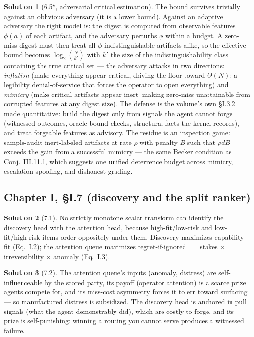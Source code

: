 \documentclass[11pt,a4paper]{article}
\theoremstyle{definition}
\newtheorem{sol}{Solution}
\theoremstyle{remark}
\begin{document}
\begin{sol}[6.5$^\star$, adversarial critical estimation]\label{sol:65}
The bound survives trivially against an oblivious adversary (it is a lower bound). Against an adaptive adversary the right model is: the digest is computed from observable features $\phi(a)$ of each artifact, and the adversary perturbs $\phi$ within a budget. A zero-miss digest must then treat all $\phi$-indistinguishable artifacts alike, so the effective bound becomes $\log_2\binom{N}{k'}$ with $k'$ the size of the indistinguishability class containing the true critical set --- the adversary attacks in two directions: \emph{inflation} (make everything appear critical, driving the floor toward $\Theta(N)$: a legibility denial-of-service that forces the operator to open everything) and \emph{mimicry} (make critical artifacts appear inert, making zero-miss unattainable from corrupted features at any digest size). The defense is the volume's own \S I.3.2 made quantitative: build the digest only from signals the agent cannot forge (witnessed outcomes, oracle-bound checks, structural facts the kernel records), and treat forgeable features as advisory. The residue is an inspection game: sample-audit inert-labeled artifacts at rate $\rho$ with penalty $B$ such that $\rho d B$ exceeds the gain from a successful mimicry --- the same Becker condition as Conj.~III.11.1, which suggests one unified deterrence budget across mimicry, escalation-spoofing, and dishonest grading.
\end{sol}

\subsection{Chapter I, \S I.7 (discovery and the split ranker)}

\begin{sol}[7.1]
No strictly monotone scalar transform can identify the discovery head with the attention head, because high-fit/low-risk and low-fit/high-risk items order oppositely under them. Discovery maximizes capability fit (Eq.~I.2); the attention queue maximizes regret-if-ignored $=$ stakes $\times$ irreversibility $\times$ anomaly (Eq.~I.3).
\end{sol}

\begin{sol}[7.2]
The attention queue's inputs (anomaly, distress) are self-influenceable by the scored party, its payoff (operator attention) is a scarce prize agents compete for, and its miss-cost asymmetry forces it to err toward surfacing --- so manufactured distress is subsidized. The discovery head is anchored in pull signals (what the agent demonstrably did), which are costly to forge, and its prize is self-punishing: winning a routing you cannot serve produces a witnessed failure.
\end{sol}
\end{document}
